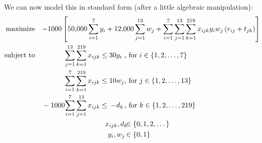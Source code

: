 \documentclass[12pt,letterpaper]{article}
\begin{document}
\begin{enumerate}
      We can now model this in standard form (after a little algebraic manipulation):
      \[
      \begin{alignedat}{7}
        \text{maximize}   \quad & {-1000\left[\num{50000} \sum_{i = 1}^{7} y_i + \num{12000} \sum_{j = 1}^{13} w_j + \sum_{i = 1}^{7} \sum_{j = 1}^{13} \sum_{k = 1}^{219} x_{ijk}y_iw_j\left(r_{ij} + t_{jk}\right)\right]} \span \span \span \span \span \span \\
        \text{subject to} \quad &       & \sum_{j = 1}^{13} \sum_{k = 1}^{219} x_{ijk} & {}\leq{} & 30 & y_i                     && \text{, for } i \in \{1, 2, \dots, 7\} \\
                                &       & \sum_{i = 1}^{7}  \sum_{k = 1}^{219} x_{ijk} & {}\leq{} & 10 & w_j                     && \text{, for } j \in \{1, 2, \dots, 13\} \\
                                & -1000 & \sum_{i = 1}^{7}  \sum_{j = 1}^{13}  x_{ijk} & {}\leq{} &  - & d_k                     && \text{, for } k \in \{1, 2, \dots, 219\} \\
                                &       &                                              &          &    & \mathclap{x_{ijk}, d_k} && \in  \{0, 1, 2, \dots\} \\
                                &       &                                              &          &    & \mathclap{y_i, w_j}     && \in  \{0, 1\} \\
      \end{alignedat}
      \]
  \end{enumerate}
\end{document}
